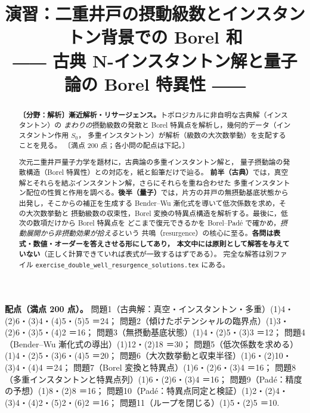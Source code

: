 \documentclass[dvipdfmx, uplatex]{jsarticle}
\title{演習：二重井戸の摂動級数とインスタントン背景での Borel 和\\
\large ―― 古典 N-インスタントン解と量子論の Borel 特異性 ――}
\author{}
\date{}
\theoremstyle{definition}
\begin{document}
\maketitle
\vspace{-6zh}

\begin{abstract}
\textbf{〔分野：解析〕漸近解析・リサージェンス。}トポロジカルに非自明な古典解（インスタントン）の
\emph{まわりの}摂動級数の発散と Borel 特異点を解析し，幾何的データ（インスタントン作用 $S_0$，
多重インスタントン）が解析（級数の大次数挙動）を支配することを見る。
〔満点 200 点；各小問の配点は下記。〕
\par{} 次元二重井戸量子力学を題材に，古典論の多重インスタントン解と，
量子摂動論の発散構造（Borel 特異性）との対応を，紙と鉛筆だけで辿る。
\textbf{前半（古典）}では，真空解とそれらを結ぶインスタントン解，さらにそれらを重ね合わせた
多重インスタントン配位の性質と作用を調べる。\textbf{後半（量子）}では，片方の井戸の無摂動基底状態から
出発し，そこからの補正を生成する Bender--Wu 漸化式を導いて低次係数を求め，その大次数挙動と
摂動級数の収束性，Borel 変換の特異点構造を解析する。最後に，低次の数項だけから Borel 特異点を
どこまで復元できるかを Borel--Pad\'e で確かめ，\emph{摂動展開から非摂動効果が拾える}という
共鳴（resurgence）の核心に至る。\textbf{各問は表式・数値・オーダーを答えさせる形にしてあり，
本文中には原則として解答を与えていない}（正しく計算できていれば表式が一致するはずである）。
完全な解答は別ファイル \texttt{exercise\_double\_well\_resurgence\_solutions.tex} にある。
\end{abstract}

\tableofcontents

\medskip
{\small\sloppy
\noindent\textbf{配点（満点 200 点）。}
問題1（古典解：真空・インスタントン・多重）(1)4・(2)6・(3)4・(4)5・(5)5 ＝24；\quad
問題2（傾けたポテンシャルの臨界点）(1)3・(2)6・(3)5・(4)2 ＝16；\quad
問題3（無摂動基底状態）(1)4・(2)5・(3)3 ＝12；\quad
問題4（Bender--Wu 漸化式の導出）(1)12・(2)18 ＝30；\quad
問題5（低次係数を求める）(1)4・(2)5・(3)6・(4)5 ＝20；\quad
問題6（大次数挙動と収束半径）(1)6・(2)10・(3)4・(4)4 ＝24；\quad
問題7（Borel 変換と特異点）(1)6・(2)6・(3)4 ＝16；\quad
問題8（多重インスタントンと特異点列）(1)6・(2)6・(3)4 ＝16；\quad
問題9（Pad\'e：精度の予想）(1)8・(2)8 ＝16；\quad
問題10（Pad\'e：特異点同定と検証）(1)2・(2)4・(3)4・(4)2・(5)2・(6)2 ＝16；\quad
問題11（ループを閉じる）(1)5・(2)5 ＝10.
\par}

\end{document}
